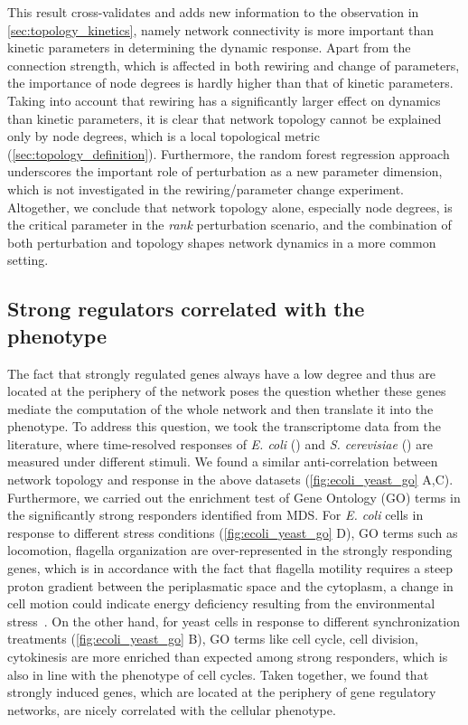 This result cross-validates and adds new information to 
the observation in 
\ref{sec:topology_kinetics}, namely network connectivity is
more important than kinetic parameters in determining the 
dynamic response. Apart from the connection strength, which is 
affected in
both rewiring and change of parameters, the importance of 
node degrees is hardly higher than that of kinetic parameters.
Taking into account that rewiring has a significantly larger
effect on dynamics than kinetic parameters, it is clear that
network topology cannot be explained only by node degrees,
which is a local topological metric 
(\ref{sec:topology_definition}). Furthermore, the random
forest regression approach underscores the important role of 
perturbation 
as a new parameter dimension, which is not investigated in
the rewiring/parameter change experiment.
Altogether, we conclude that
network topology alone, especially node degrees, is the 
critical parameter in the \emph{rank} perturbation scenario, 
and the combination of both perturbation and topology shapes
network dynamics in a more common setting.

\subsection{Strong regulators correlated with the phenotype}
\label{sec:strong_regulator_phenotype}
The fact that strongly regulated genes always have a low degree and thus are
located at the periphery of the network poses the question whether these genes
mediate the computation of the whole network and then translate it into the 
phenotype. To address this question, we took the transcriptome data from the literature,
where time-resolved responses of \emph{E. coli} (\citealp{Jozefczuk2010}) and 
\emph{S. cerevisiae} (\citealp{Spellman1998,Cho1998}) are
measured under different stimuli. We found a similar anti-correlation between
network topology and response in the above datasets (\ref{fig:ecoli_yeast_go} A,C). Furthermore, we
carried out the enrichment test of Gene Ontology (GO) terms in the significantly 
strong responders identified from MDS. 
For \emph{E. coli} cells in response
to different stress conditions (\ref{fig:ecoli_yeast_go} D), GO terms such as 
locomotion, flagella organization
are over-represented in the strongly responding genes, which is in accordance
with the fact that flagella motility requires a steep proton gradient between 
the periplasmatic space and the cytoplasm, a change in cell motion could 
indicate energy deficiency resulting from the environmental stress~\citep{Jozefczuk2010}. 
On the other hand, for yeast cells in response to different synchronization
treatments (\ref{fig:ecoli_yeast_go} B), GO terms like cell cycle, cell division, cytokinesis are more 
enriched than expected among strong responders, which is also in line with the
phenotype of cell cycles. Taken together, we found that strongly induced genes, 
which are located at the periphery of gene regulatory networks, are nicely
correlated with the cellular phenotype.

